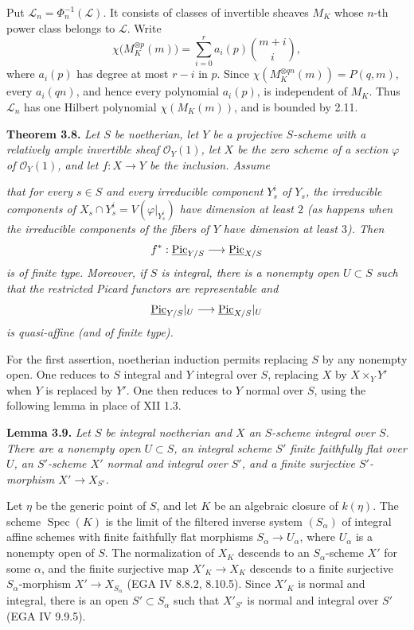 Put \(\mathscr L_n=\Phi_n^{-1}(\mathscr L)\). It consists of classes of
invertible sheaves \(M_K\) whose \(n\)-th power class belongs to
\(\mathscr L\). Write
\[
\chi\bigl(M_K^{\otimes p}(m)\bigr)
=\sum_{i=0}^{r}a_i(p)\binom{m+i}{i},
\]
where \(a_i(p)\) has degree at most \(r-i\) in \(p\). Since
\(\chi(M_K^{\otimes qn}(m))=P(q,m)\), every \(a_i(qn)\), and hence every
polynomial \(a_i(p)\), is independent of \(M_K\). Thus \(\mathscr L_n\)
has one Hilbert polynomial \(\chi(M_K(m))\), and is bounded by 2.11.

\textbf{Theorem 3.8.} \emph{Let \(S\) be noetherian, let \(Y\) be a
projective \(S\)-scheme with a relatively ample invertible sheaf
\(\mathcal O_Y(1)\), let \(X\) be the zero scheme of a section \(\varphi\)
of \(\mathcal O_Y(1)\), and let \(f:X\to Y\) be the inclusion. Assume}

\emph{that for every \(s\in S\) and every irreducible component \(Y_s^i\)
of \(Y_s\), the irreducible components of
\(X_s\cap Y_s^i=V(\varphi|_{Y_s^i})\) have dimension at least \(2\)
(as happens when the irreducible components of the fibers of \(Y\) have
dimension at least \(3\)). Then}
\[
f^*:\underline{\operatorname{Pic}}_{Y/S}\longrightarrow\underline{\operatorname{Pic}}_{X/S}
\]
\emph{is of finite type. Moreover, if \(S\) is integral, there is a
nonempty open \(U\subset S\) such that the restricted Picard functors
are representable and}
\[
\underline{\operatorname{Pic}}_{Y/S}|_U\longrightarrow\underline{\operatorname{Pic}}_{X/S}|_U
\]
\emph{is quasi-affine (and of finite type).}

For the first assertion, noetherian induction permits replacing \(S\) by
any nonempty open. One reduces to \(S\) integral and \(Y\) integral over
\(S\), replacing \(X\) by \(X\times_Y Y'\) when \(Y\) is replaced by
\(Y'\). One then reduces to \(Y\) normal over \(S\), using the following
lemma in place of XII 1.3.

\textbf{Lemma 3.9.} \emph{Let \(S\) be integral noetherian and \(X\) an
\(S\)-scheme integral over \(S\). There are a nonempty open \(U\subset S\),
an integral scheme \(S'\) finite faithfully flat over \(U\), an
\(S'\)-scheme \(X'\) normal and integral over \(S'\), and a finite
surjective \(S'\)-morphism \(X'\to X_{S'}\).}

Let \(\eta\) be the generic point of \(S\), and let \(K\) be an algebraic
closure of \(k(\eta)\). The scheme \(\operatorname{Spec}(K)\) is the
limit of the filtered inverse system \((S_\alpha)\) of integral affine
schemes with finite faithfully flat morphisms
\(S_\alpha\to U_\alpha\), where \(U_\alpha\) is a nonempty open of \(S\).
The normalization of \(X_K\) descends to an \(S_\alpha\)-scheme \(X'\) for
some \(\alpha\), and the finite surjective map \(X'_K\to X_K\) descends
to a finite surjective \(S_\alpha\)-morphism \(X'\to X_{S_\alpha}\)
(EGA IV 8.8.2, 8.10.5). Since \(X'_K\) is normal and integral, there is
an open \(S'\subset S_\alpha\) such that \(X'_{S'}\) is normal and
integral over \(S'\) (EGA IV 9.9.5).

